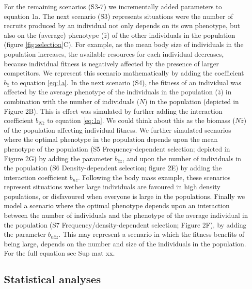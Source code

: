 \documentclass{article}
\begin{document}
For the remaining scenarios (S3-7) we incrementally added parameters to equation 1a. The next scenario (S3) represents situations were the number of recruits produced by an individual not only depends on its own phenotype, but also on the (average) phenotype ($\bar{z}$) of the other individuals in the population (figure \ref{fig:selection}C). For example, as the mean body size of individuals in the population increases, the available resources for each individual decreases, because individual fitness is negatively affected by the presence of larger competitors. We represent this scenario mathematically by adding the coefficient $b_{\bar{z}}$ to equation \ref{eq:1a}. In the next scenario (S4), the fitness of an individual was affected by the average phenotype of the individuals in the population ($\bar{z}$) in combination with the number of individuals ($N$) in the population (depicted in Figure 2B). This is effect was simulated by further adding the interaction coefficient $b_{N\bar{z}}$ to equation \ref{eq:1a}. We could think about this as the biomass (${N\bar{z}}$) of the population affecting individual fitness. We further simulated scenarios where the optimal phenotype in the population depends upon the mean phenotype of the population (S5 Frequency-dependent selection; depicted in Figure 2G) by adding the parameter $b_{\bar{z}z}$, and upon the number of individuals in the population (S6 Density-dependent selection; figure 2E) by adding the interaction coefficient $b_{nz}$. Following the body mass example, these scenarios represent situations wether large individuals are favoured in high density populations, or disfavoured when everyone is large in the populations. Finally we model a scenario where the optimal phenotype depends upon an interaction between the number of individuals and the phenotype of the average individual in the population (S7 Frequency/density-dependent selection; Figure 2F), by adding the parameter $b_{n\bar{z}z}$. This may represent a scenario in which the fitness benefits of being large, depends on the number and size of the individuals in the population. For the full equation see Sup mat xx.


\subsection{Statistical analyses}
\end{document}
